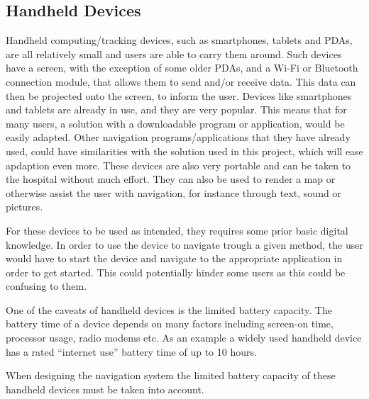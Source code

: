 
\subsection{Handheld Devices} %
\label{sub:device}

 	 
Handheld computing/tracking devices, such as smartphones, tablets and PDAs, are all relatively small and users are able to carry them around. Such devices have a screen, with the exception of some older PDAs, and a Wi-Fi or Bluetooth connection module, that allows them to send and/or receive data. This data can then be projected onto the screen, to inform the user.
Devices like smartphones and tablets are already in use, and they are very popular. This means that for many users, a solution with a downloadable program or application, would be easily adapted. Other navigation programs/applications that they have already used, could have similarities with the solution used in this project, which will ease apdaption even more. These devices are also very portable and can be taken to the hospital without much effort. They can also be used to render a map or otherwise assist the user with navigation, for instance through text, sound or pictures.

For these devices to be used as intended, they requires some prior basic digital knowledge. In order to use the device to navigate trough a given method, the user would have to start the device and navigate to the appropriate application in order to get started. This could potentially hinder some users as this could be confusing to them.

One of the caveats of handheld devices is the limited battery capacity. The battery time of a device depends on many factors including screen-on time, processor usage, radio modems etc. As an example a widely used handheld device has a rated \enquote{internet use} battery time of up to 10 hours. \cite{Apple}

When designing the navigation system the limited battery capacity of these handheld devices must be taken into account.